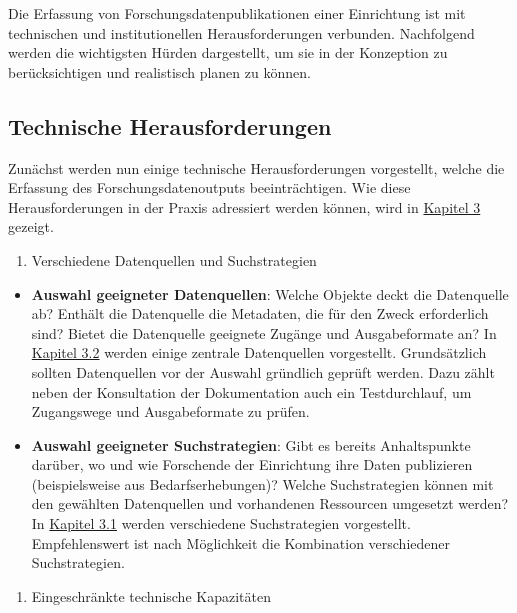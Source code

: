 \documentclass[
  ngerman,
  letterpaper,
  DIV=11]{scrreprt}
\providecommand{\tightlist}{%
  \setlength{\itemsep}{0pt}\setlength{\parskip}{0pt}}
\begin{document}
Die Erfassung von Forschungsdatenpublikationen einer Einrichtung ist mit
technischen und institutionellen Herausforderungen verbunden.
Nachfolgend werden die wichtigsten Hürden dargestellt, um sie in der
Konzeption zu berücksichtigen und realistisch planen zu können.

\subsection{Technische
Herausforderungen}\label{technische-herausforderungen}

Zunächst werden nun einige technische Herausforderungen vorgestellt,
welche die Erfassung des Forschungsdatenoutputs beeinträchtigen. Wie
diese Herausforderungen in der Praxis adressiert werden können, wird in
\href{./3_Durchführung.qmd}{Kapitel 3} gezeigt.

\begin{enumerate}
\def\labelenumi{\arabic{enumi}.}
\tightlist
\item
  Verschiedene Datenquellen und Suchstrategien
\end{enumerate}

\begin{itemize}
\tightlist
\item
  \textbf{Auswahl geeigneter Datenquellen}: Welche Objekte deckt die
  Datenquelle ab? Enthält die Datenquelle die Metadaten, die für den
  Zweck erforderlich sind? Bietet die Datenquelle geeignete Zugänge und
  Ausgabeformate an? In \hyperref[suchstrategien]{Kapitel 3.2} werden
  einige zentrale Datenquellen vorgestellt. Grundsätzlich sollten
  Datenquellen vor der Auswahl gründlich geprüft werden. Dazu zählt
  neben der Konsultation der Dokumentation auch ein Testdurchlauf, um
  Zugangswege und Ausgabeformate zu prüfen.
\item
  \textbf{Auswahl geeigneter Suchstrategien}: Gibt es bereits
  Anhaltspunkte darüber, wo und wie Forschende der Einrichtung ihre
  Daten publizieren (beispielsweise aus Bedarfserhebungen)? Welche
  Suchstrategien können mit den gewählten Datenquellen und vorhandenen
  Ressourcen umgesetzt werden? In
  \hyperref[grundprinzipien-und-schematischer-ablauf]{Kapitel 3.1}
  werden verschiedene Suchstrategien vorgestellt. Empfehlenswert ist
  nach Möglichkeit die Kombination verschiedener Suchstrategien.
\end{itemize}

\begin{enumerate}
\def\labelenumi{\arabic{enumi}.}
\setcounter{enumi}{1}
\tightlist
\item
  Eingeschränkte technische Kapazitäten
\end{enumerate}
\end{document}
